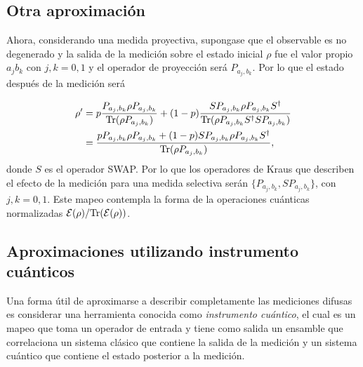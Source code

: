     







\subsection{Otra aproximación}
    Ahora, considerando una medida proyectiva, supongase que el observable es no degenerado y la salida de la medición sobre el estado inicial $\rho $ fue el valor propio $a_j b_k$ con $j,k=0,1$ y el operador de proyección será $P_{a_j,b_k}$. Por lo que el estado después de la medición será 
    
    \begin{equation}
       \begin{split}
           \rho'&= p\dfrac{ P_{a_j,b_k}\rho P_{a_j,b_k}}{{\rm Tr}(\rho P_{a_j,b_k})}+ (1-p)\dfrac{S P_{a_j,b_k}\rho P_{a_j,b_k}S^\dagger}{{\rm Tr}(\rho P_{a_j,b_k} S^\dagger SP_{a_j,b_k})}\\
           &=\dfrac{p P_{a_j,b_k}\rho P_{a_j,b_k}+(1-p) S P_{a_j,b_k}\rho P_{a_j,b_k}S^\dagger}{{\rm Tr}(\rho P_{a_j,b_k})},
       \end{split}
    \end{equation}
    donde $S$ es el operador SWAP\@. Por lo que los operadores de Kraus que describen el efecto de la medición para una medida selectiva serán $\{P_{a_j,b_k}, S P_{a_j,b_k}\}$, con $j,k=0,1$. Este mapeo contempla la forma de la operaciones cuánticas normalizadas $\mathcal{E}(\rho)/{\rm Tr}(\mathcal{E}(\rho))$. 
    
    
   
   


\subsection{Aproximaciones utilizando instrumento cuánticos}

Una forma útil de aproximarse a describir completamente las mediciones difusas es considerar una herramienta conocida como \textit{instrumento cuántico}, el cual es un mapeo que toma un operador de entrada y tiene como salida un ensamble que correlaciona un sistema clásico que contiene la salida de la medición y un sistema cuántico que contiene el estado posterior a la medición. 


